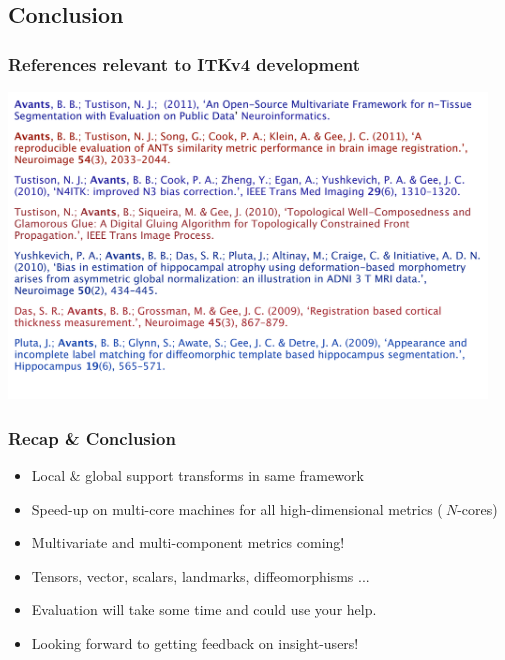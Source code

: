 \subsection{Conclusion}

\begin{frame}
\Large
\frametitle{References relevant to ITKv4 development}
\includegraphics[height=3.2in]{../Art/registration_references}
\end{frame}

\begin{frame}
\Large
\frametitle{Recap \& Conclusion}
\begin{itemize}
\item Local \& global support transforms in same framework
\pause
\item Speed-up on multi-core machines for all high-dimensional metrics ($~N$-cores)
\pause
\item Multivariate and multi-component metrics coming!
\pause
\item Tensors, vector, scalars, landmarks, diffeomorphisms ... 
\pause
\item Evaluation will take some time and could use your help.
\pause
\item Looking forward to getting feedback on insight-users! 
\end{itemize}
\end{frame}
